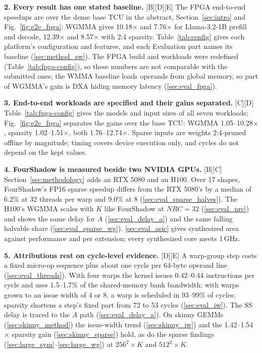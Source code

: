 \vspace{1pt}
\noindent\textbf{2. Every result has one stated baseline.} [B][D][E] The FPGA end-to-end
speedups are over the dense base TCU in the abstract, Section~\ref{sec:intro} and
Fig.~\ref{fig:e2e_fpga}: WGMMA gives 10.18$\times$ and 7.76$\times$ for Llama-3.2-1B prefill and
decode, 12.39$\times$ and 8.57$\times$ with 2:4 sparsity. Table~\ref{tab:config} gives each
platform's configuration and features, and each Evaluation part names its baseline
(\ref{sec:method_sw}). The FPGA build and workloads were redefined (Table~\ref{tab:fpga-config}),
so these numbers are not comparable with the submitted ones; the WMMA baseline loads operands
from global memory, so part of WGMMA's gain is DXA hiding memory latency (\ref{sec:eval_fpga}).

\vspace{1pt}
\noindent\textbf{3. End-to-end workloads are specified and their gains separated.} [C][D]
Table~\ref{tab:fpga-config} gives the models and input sizes of all seven workloads;
Fig.~\ref{fig:e2e_fpga} separates the gains over the base TCU: WGMMA 1.05--10.28$\times$, sparsity
1.02--1.51$\times$, both 1.76--12.74$\times$. Sparse inputs are weights 2:4-pruned offline by
magnitude; timing covers device execution only, and cycles do not depend on the kept values.

\vspace{1pt}
\noindent\textbf{4. FourShadow is measured beside two NVIDIA GPUs.} [B][C]
Section~\ref{sec:methodology} adds an RTX 5080 and an H100. Over 17 shapes, FourShadow's FP16
sparse speedup differs from the RTX 5080's by a median of 6.2\% at 32 threads per warp and 9.0\%
at 8 (\ref{sec:eval_sparse_halves}). The H100's WGMMA scales with $K$ like FourShadow at
$\mathit{NRC}{=}32$ (\ref{sec:eval_nrc}) and shows the same delay for $A$ (\ref{sec:eval_delay_a})
and the same falling halvable share (\ref{sec:eval_sparse_wg}). \ref{sec:eval_asic} gives
synthesized area against performance and per extension; every synthesized core meets 1\,GHz.

\vspace{1pt}
\noindent\textbf{5. Attributions rest on cycle-level evidence.} [D][E] A warp-group step costs a
fixed micro-op sequence plus about one cycle per 64-byte operand line (\ref{sec:eval_threads}).
With four warps the kernel issues 0.42--0.44 instructions per cycle and uses 1.5--1.7\% of the
shared-memory bank bandwidth; with warps grown to an issue width of 4 or 8, a warp is scheduled
in 93--99\% of cycles; sparsity shortens a step's fixed part from 72 to 53 cycles
(\ref{sec:eval_iw}). The SS delay is traced to the $A$ path (\ref{sec:eval_delay_a}). On skinny
GEMMs (\ref{sec:skinny_method}) the issue-width trend (\ref{sec:skinny_iw}) and the
1.42--1.54$\times$ sparsity gain (\ref{sec:skinny_sparse}) hold, as do the sparse findings
(\ref{sec:large_sym}--\ref{sec:large_wg}) at $256^2{\times}K$ and $512^2{\times}K$.

